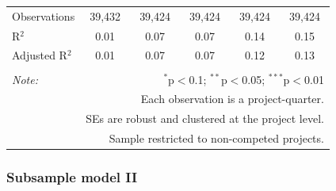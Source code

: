 \documentclass[
]{article}
\begin{document}
\begin{table}[H]
\begin{tabular}{@{\extracolsep{-2pt}}lccccc}
Observations & 39,432 & 39,424 & 39,424 & 39,424 & 39,424 \\ 
R$^{2}$ & 0.01 & 0.07 & 0.07 & 0.14 & 0.15 \\ 
Adjusted R$^{2}$ & 0.01 & 0.07 & 0.07 & 0.12 & 0.13 \\ 
\hline 
\hline \\[-1.8ex] 
\textit{Note:}  & \multicolumn{5}{r}{$^{*}$p$<$0.1; $^{**}$p$<$0.05; $^{***}$p$<$0.01} \\ 
 & \multicolumn{5}{r}{Each observation is a project-quarter.} \\ 
 & \multicolumn{5}{r}{SEs are robust and clustered at the project level.} \\ 
 & \multicolumn{5}{r}{Sample restricted to non-competed projects.} \\ 
\end{tabular} 
\end{table}

\hypertarget{subsample-model-ii}{%
\subsubsection{Subsample model II}\label{subsample-model-ii}}
\end{document}
